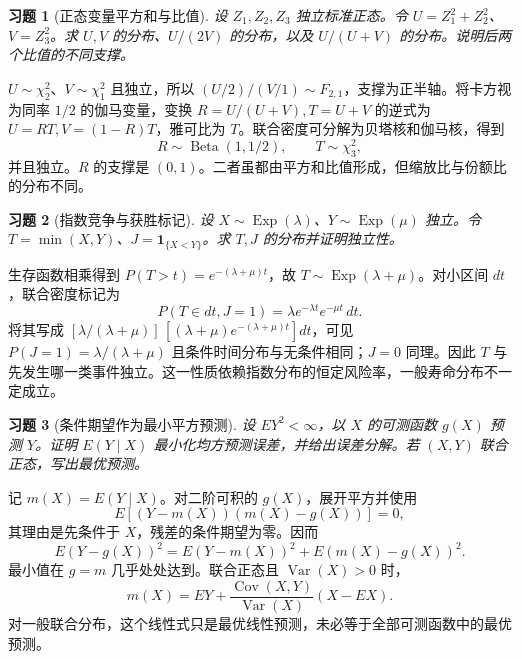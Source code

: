 \documentclass[UTF8,12pt,a4paper,fontset=fandol]{ctexart}
\newtheorem{exercise}{习题}[section]
\begin{document}
\begin{exercise}[正态变量平方和与比值]\label{q:B17.6}
设 $Z_1,Z_2,Z_3$ 独立标准正态。令 $U=Z_1^2+Z_2^2$、$V=Z_3^2$。求 $U,V$ 的分布、$U/(2V)$ 的分布，以及 $U/(U+V)$ 的分布。说明后两个比值的不同支撑。\par{}
\end{exercise}

\begin{solve}\label{a:B17.6}$U\sim\chi^2_2$、$V\sim\chi^2_1$ 且独立，所以 $(U/2)/(V/1)\sim F_{2,1}$，支撑为正半轴。将卡方视为同率 $1/2$ 的伽马变量，变换 $R=U/(U+V),T=U+V$ 的逆式为 $U=RT,V=(1-R)T$，雅可比为 $T$。联合密度可分解为贝塔核和伽马核，得到\[R\sim\operatorname{Beta}(1,1/2),\qquad T\sim\chi^2_3,\]并且独立。$R$ 的支撑是 $(0,1)$。二者虽都由平方和比值形成，但缩放比与份额比的分布不同。\end{solve}

\begin{exercise}[指数竞争与获胜标记]\label{q:B17.7}
设 $X\sim\operatorname{Exp}(\lambda)$、$Y\sim\operatorname{Exp}(\mu)$ 独立。令 $T=\min(X,Y)$、$J=\mathbf1_{\{X<Y\}}$。求 $T,J$ 的分布并证明独立性。\par{}
\end{exercise}

\begin{solve}\label{a:B17.7}生存函数相乘得到 $P(T>t)=e^{-(\lambda+\mu)t}$，故 $T\sim\operatorname{Exp}(\lambda+\mu)$。对小区间 $dt$，联合密度标记为\[P(T\in dt,J=1)=\lambda e^{-\lambda t}e^{-\mu t}\,dt.\]将其写成 $[\lambda/(\lambda+\mu)]\,[(\lambda+\mu)e^{-(\lambda+\mu)t}]dt$，可见 $P(J=1)=\lambda/(\lambda+\mu)$ 且条件时间分布与无条件相同；$J=0$ 同理。因此 $T$ 与先发生哪一类事件独立。这一性质依赖指数分布的恒定风险率，一般寿命分布不一定成立。\end{solve}

\begin{exercise}[条件期望作为最小平方预测]\label{q:B17.8}
设 $EY^2<\infty$，以 $X$ 的可测函数 $g(X)$ 预测 $Y$。证明 $E(Y\mid X)$ 最小化均方预测误差，并给出误差分解。若 $(X,Y)$ 联合正态，写出最优预测。\par{}
\end{exercise}

\begin{solve}\label{a:B17.8}记 $m(X)=E(Y\mid X)$。对二阶可积的 $g(X)$，展开平方并使用\[E[(Y-m(X))(m(X)-g(X))]=0,\]其理由是先条件于 $X$，残差的条件期望为零。因而\[E(Y-g(X))^2=E(Y-m(X))^2+E(m(X)-g(X))^2.\]最小值在 $g=m$ 几乎处处达到。联合正态且 $\operatorname{Var}(X)>0$ 时，\[m(X)=EY+\frac{\operatorname{Cov}(X,Y)}{\operatorname{Var}(X)}(X-EX).\]对一般联合分布，这个线性式只是最优线性预测，未必等于全部可测函数中的最优预测。\end{solve}
\end{document}
